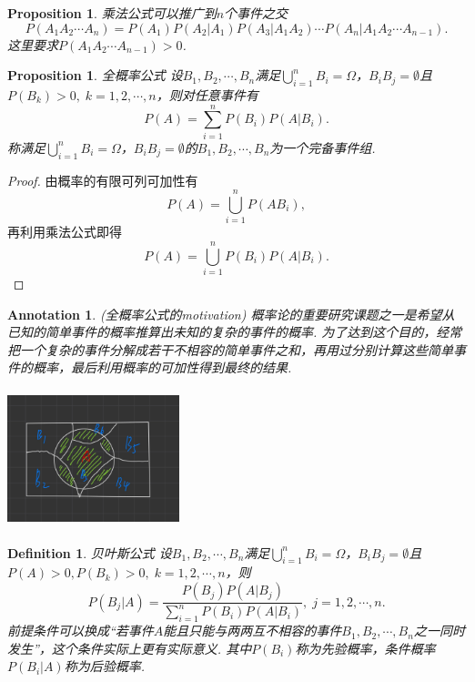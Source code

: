 \documentclass{article}
\newtheorem{proposition}[theorem]{Proposition}
\newtheorem{definition}[theorem]{Definition}
\newtheorem{annotation}[theorem]{Annotation}
\begin{document}
\begin{proposition}
\rm 乘法公式可以推广到$n$个事件之交
$$
P(A_1A_2\cdots A_n) = P(A_1)P(A_2|A_1)P(A_3|A_1A_2)\cdots P(A_n|A_1A_2\cdots A_{n-1}).
$$
这里要求$P(A_1A_2\cdots A_{n-1}) > 0$. 
\end{proposition}

\begin{proposition}
\rm {\color{red}全概率公式} 设$B_1,B_2,\cdots,B_n$满足$\bigcup\limits_{i=1}^n B_i = \Omega$，$B_iB_j = \emptyset$且$P(B_k) > 0,\; k=1,2,\cdots,n$，则对任意事件有
$$
P(A) = \sum\limits_{i=1}^n P(B_i)P(A|B_i).
$$
称满足$\bigcup\limits_{i=1}^n B_i = \Omega$，$B_iB_j = \emptyset$的$B_1,B_2,\cdots,B_n$为一个{\color{red}完备事件组}.
\end{proposition}

\begin{proof}
由概率的有限可列可加性有
$$
P(A) = \bigcup\limits_{i=1}^n P(AB_i),
$$
再利用乘法公式即得
$$
P(A) = \bigcup\limits_{i=1}^n P(B_i)P(A|B_i).
$$
\end{proof}

\begin{annotation}
\rm {\color{red}(全概率公式的motivation)} 概率论的重要研究课题之一是希望从已知的简单事件的概率推算出未知的复杂的事件的概率. 为了达到这个目的，经常把一个复杂的事件分解成若干不相容的简单事件之和，再用过分别计算这些简单事件的概率，最后利用概率的可加性得到最终的结果.

\begin{center}
\includegraphics[width=5cm, height=4cm]{images/total_probability.jpg}
\end{center}
\end{annotation}

\begin{definition}
\rm {\color{red}贝叶斯公式} 设$B_1,B_2,\cdots,B_n$满足$\bigcup\limits_{i=1}^n B_i = \Omega$，$B_iB_j = \emptyset$且$P(A)>0, P(B_k) > 0,\; k=1,2,\cdots,n$，则
	$$
		P(B_j | A) = \frac{P(B_j)P(A|B_j)}{\sum\limits_{i=1}^n P(B_i)P(A|B_i)},\; j = 1,2,\cdots,n.
	$$
前提条件可以换成“若事件$A$能且只能与两两互不相容的事件$B_1,B_2,\cdots,B_n$之一同时发生”，这个条件实际上更有实际意义. 其中$P(B_i)$称为先验概率，条件概率$P(B_i | A)$称为后验概率. 
\end{definition}
\end{document}
